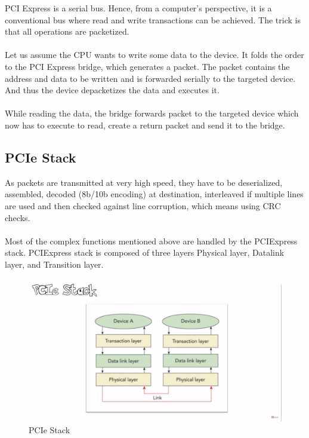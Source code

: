 PCI Express is a serial bus. Hence, from a computer's perspective, it is a conventional bus where read and write transactions can be achieved. The trick is that all operations are packetized. \\\\
Let us assume the CPU wants to write some data to the device. It folds the order to the PCI Express bridge, which generates a packet. The packet contains the address and data to be written and is forwarded serially to the targeted device. And thus the device depacketizes the data and executes it.\\\\
While reading the data, the bridge forwards packet to the targeted device which now has to execute to read, create a return packet and send it to the bridge.

\subsection{PCIe Stack}

As packets are transmitted at very high speed, they have to be deserialized, assembled, decoded (8b/10b encoding) at destination,  interleaved if multiple lines are used and then checked against line corruption, which means using CRC checks.\\\\
Most of the complex functions mentioned above are handled by the PCIExpress stack. PCIExpress stack is composed of three layers Physical layer, Datalink layer, and Transition layer.

\begin{figure}[H]
	\begin{center}
		\includegraphics[width=5in]{images/PCIeStack.png}
		\caption{PCIe Stack}
		\label{PCIeStack}
	\end{center}
\end{figure}

